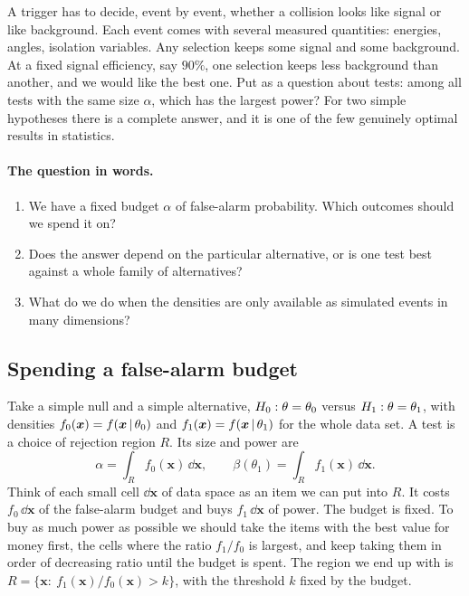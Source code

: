 A trigger has to decide, event by event, whether a collision looks like
signal or like background. Each event comes with several measured
quantities: energies, angles, isolation variables. Any selection keeps some
signal and some background. At a fixed signal efficiency, say $90\%$, one
selection keeps less background than another, and we would like the best one.
Put as a question about tests: among all tests
with the same size $\alpha$, which has the largest power? For two simple
hypotheses there is a complete answer, and it is one of the few genuinely
optimal results in statistics.

\paragraph{The question in words.}
\begin{enumerate}[label=\arabic*.]
  \item We have a fixed budget $\alpha$ of false-alarm probability. Which
        outcomes should we spend it on?
  \item Does the answer depend on the particular alternative, or is one test
        best against a whole family of alternatives?
  \item What do we do when the densities are only available as simulated
        events in many dimensions?
\end{enumerate}

\subsection{Spending a false-alarm budget}
\label{4a:sec:np-budget}

Take a simple null and a simple alternative, $H_0:\theta=\theta_0$ versus
$H_1:\theta=\theta_1$, with densities $f_0(\bm x)=f(\bm x\,\vert\,\theta_0)$ and
$f_1(\bm x)=f(\bm x\,\vert\,\theta_1)$ for the whole data set. A test is a choice
of rejection region $R$. Its size and power are
\[
  \alpha=\int_R f_0(\bm x)\,\dd\bm x,
  \qquad
  \beta(\theta_1)=\int_R f_1(\bm x)\,\dd\bm x .
\]
Think of each small cell $\dd\bm x$ of data space as an item we can put into
$R$. It costs $f_0\,\dd\bm x$ of the false-alarm budget and buys $f_1\,\dd\bm x$
of power. The budget is fixed. To buy as much power as possible we should take
the items with the best value for money first, the cells where the ratio
$f_1/f_0$ is largest, and keep taking them in order of decreasing ratio until
the budget is spent. The region we end up with is
$R=\{\bm x:\ f_1(\bm x)/f_0(\bm x)>k\}$, with the threshold $k$ fixed by the
budget.

